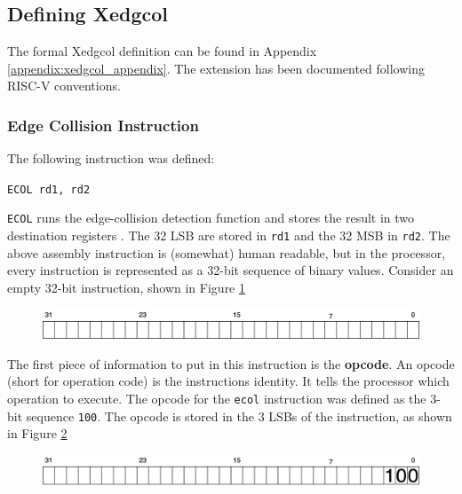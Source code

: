 \subsection{Defining Xedgcol}
    The formal Xedgcol definition can be found in Appendix \ref{appendix:xedgcol_appendix}. The extension has been documented following RISC-V conventions.

    \subsubsection{Edge Collision Instruction}
    The following instruction was defined:

    \begin{center}
    \texttt{ECOL rd1, rd2}
    \end{center}

    \texttt{ECOL} runs the edge-collision detection function and stores the result in two destination registers . The 32 \gls{LSB} are stored in \texttt{rd1} and the 32 \gls{MSB} in \texttt{rd2}. The above assembly instruction is (somewhat) human readable, but in the processor, every instruction is represented as a 32-bit sequence of binary values. Consider an empty 32-bit instruction, shown in Figure \ref{fig:instr_blank}

    \begin{figure}[H]
    \begin{center}
    \includegraphics[width=0.85\linewidth]{chapters/chapter4/img/instr_blank.png} 
    \label{fig:instr_blank}
    \end{center}
    \end{figure}

    The first piece of information to put in this instruction is the \textbf{opcode}. An opcode (short for operation code) is the instructions identity. It tells the processor which operation to execute. The opcode for the \texttt{ecol} instruction was defined as the 3-bit sequence \texttt{100}. The opcode is stored in the 3 \glspl{LSB} of the instruction, as shown in Figure \ref{fig:instr_op}

    \begin{figure}[H]
    \begin{center}
    \includegraphics[width=0.85\linewidth]{chapters/chapter4/img/instr_op.png} 
    \label{fig:instr_op}
    \end{center}
    \end{figure}


